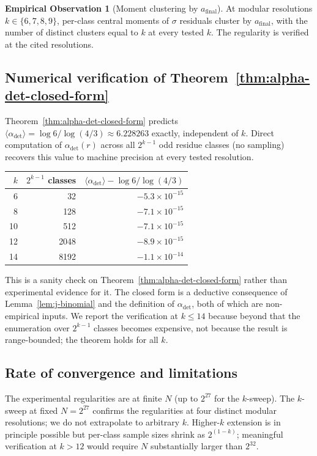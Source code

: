 \documentclass[pdflatex,sn-mathphys-num]{sn-jnl}
\theoremstyle{thmstyleone}%
\theoremstyle{definition}
\newtheorem{observation}[theorem]{Empirical Observation}
\theoremstyle{plain}
\begin{document}
\begin{observation}[Moment clustering by $a_{\text{final}}$]
\label{obs:moment-clustering}
At modular resolutions $k \in \{6, 7, 8, 9\}$, per-class central moments of $\sigma$ residuals cluster by $a_{\text{final}}$, with the number of distinct clusters equal to $k$ at every tested $k$. The regularity is verified at the cited resolutions.
\end{observation}

\subsection{Numerical verification of Theorem~\ref{thm:alpha-det-closed-form}}
\label{sec:closed-form-verification}
Theorem~\ref{thm:alpha-det-closed-form} predicts $\langle \alpha_{\text{det}} \rangle = \log 6 / \log(4/3) \approx 6.228263$ exactly, independent of $k$. Direct computation of $\alpha_{\text{det}}(r)$ across all $2^{k-1}$ odd residue classes (no sampling) recovers this value to machine precision at every tested resolution.

\begin{center}
\begin{tabular}{rrr}
\toprule
$k$ & $2^{k-1}$ classes & $\langle \alpha_{\text{det}} \rangle - \log 6 / \log(4/3)$  \\
\midrule
6 & 32 & $-5.3 \times 10^{-15}$ \\
8 & 128 & $-7.1 \times 10^{-15}$ \\
10 & 512 & $-7.1 \times 10^{-15}$ \\
12 & 2048 & $-8.9 \times 10^{-15}$ \\
14 & 8192 & $-1.1 \times 10^{-14}$ \\
\bottomrule
\end{tabular}
\end{center}

This is a sanity check on Theorem~\ref{thm:alpha-det-closed-form} rather than experimental evidence for it. The closed form is a deductive consequence of Lemma~\ref{lem:j-binomial} and the definition of $\alpha_{\text{det}}$, both of which are non-empirical inputs. We report the verification at $k \leq 14$ because beyond that the enumeration over $2^{k-1}$ classes becomes expensive, not because the result is range-bounded; the theorem holds for all $k$.

\subsection{Rate of convergence and limitations}
The experimental regularities are at finite $N$ (up to $2^{27}$ for the $k$-sweep). The $k$-sweep at fixed $N=2^{27}$ confirms the regularities at four distinct modular resolutions; we do not extrapolate to arbitrary $k$. Higher-$k$ extension is in principle possible but per-class sample sizes shrink as $2^{(1-k)}$; meaningful verification at $k > 12$ would require $N$ substantially larger than $2^{32}$.
\end{document}
